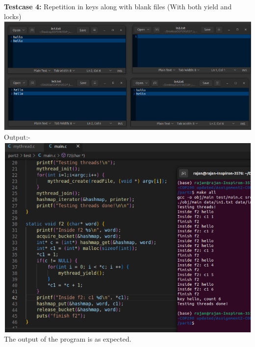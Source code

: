 \documentclass[12pt]{article}
\begin{document}
\begin{spacing}{1.2}
\textbf{Testcase 4:} Repetition in keys along with blank files (With both yield and locks)\\
\includegraphics[width=20cm]{images/28.png}\\
Output:-\\
\includegraphics[width=20cm]{images/29.png}\\
The output of the program is as expected.
    \newpage



\end{spacing}
\end{document}
